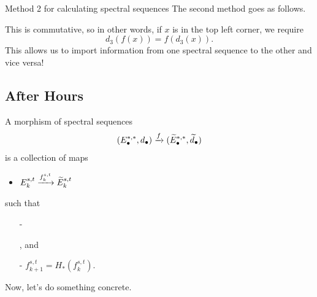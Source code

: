 \begin{remark}{Method 2 for calculating spectral sequences}{}
    The second method goes as follows. 
    \begin{center}
    \end{center}
    This is commutative, so in other words, if $x$ is in the top left corner, we require $$d_3(f(x)) = f(d_3(x)).$$ This allows us to import information from one spectral sequence to the other and vice versa!
\end{remark}

\newpage
\subsection{After Hours}
\begin{definition}{}{}
    A morphism of spectral sequences $$(E_\bullet^{\ast,\ast},d_\bullet)\xrightarrow{f}(\widetilde{E}_\bullet^{\ast,\ast},\widetilde{d}_\bullet)$$ is a collection of maps
    \begin{itemize}
        \item $E_k^{s,t}\xrightarrow{f_k^{s,t}}\widetilde{E}_k^{s,t}$
    \end{itemize}
    such that 
    \begin{multicols}{2}
        \begin{itemize}
            \item[-]   , and \columnbreak
            \item[-] $f_{k+1}^{s,t} = H_\ast(f_k^{s,t})$.
        \end{itemize}
    \end{multicols}
\end{definition}
Now, let's do something concrete. 

